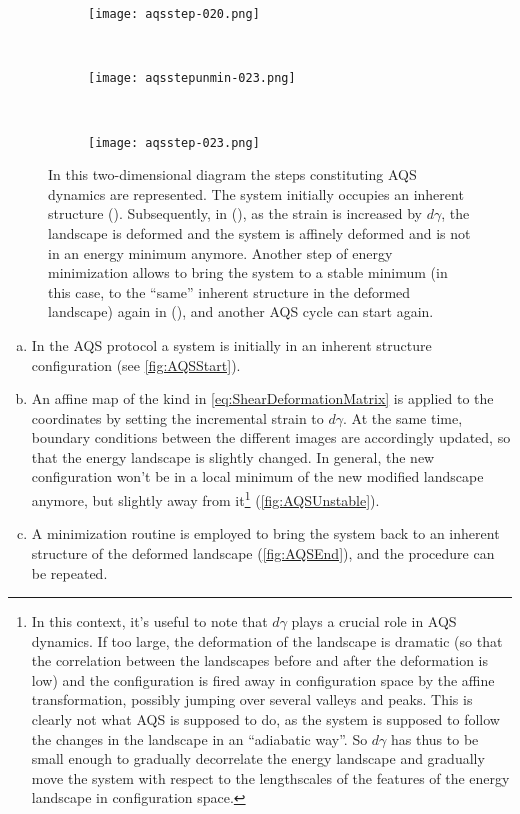 \begin{figure}
	\centering
	\begin{subfigure}[b]{\textwidth}
		\centering
		\texttt{[image: aqsstep-020.png]}
		\caption{\label{fig:AQSStart}}
	\end{subfigure} \\
	\begin{subfigure}[b]{\textwidth}
		\centering
		\texttt{[image: aqsstepunmin-023.png]}
		\caption{\label{fig:AQSUnstable}}
	\end{subfigure} \\
	\begin{subfigure}[b]{\textwidth}
		\centering
		\texttt{[image: aqsstep-023.png]}
		\caption{\label{fig:AQSEnd}}
	\end{subfigure} 
	\caption{In this two-dimensional diagram the steps constituting AQS dynamics are represented. The system initially occupies an inherent structure (). Subsequently, in (), as the strain is increased by $d\gamma$, the landscape is deformed and the system is affinely deformed and is not in an energy minimum anymore. Another step of energy minimization allows to bring the system to a stable minimum (in this case, to the ``same'' inherent structure in the deformed landscape) again in (), and another AQS cycle can start again.
	\label{fig:AQSsteps}}
\end{figure}

\begin{enumerate}[(a)]
\item In the AQS protocol a system is initially in an inherent structure configuration (see \autoref{fig:AQSStart}). 
\item An affine map of the kind in \autoref{eq:ShearDeformationMatrix} is applied to the coordinates by setting the incremental strain to $d\gamma$. 
At the same time, boundary conditions between the different images are accordingly updated, so that the energy landscape is slightly changed. In general, the new configuration won't be in a local minimum of the new modified landscape anymore, but slightly away from it\footnote{In this context, it's useful to note that $d\gamma$ plays a crucial role in AQS dynamics. If too large, the deformation of the landscape is dramatic (so that the correlation between the landscapes before and after the deformation is low) and the configuration is fired away in configuration space by the affine transformation, possibly jumping over several valleys and peaks. This is clearly not what AQS is supposed to do, as the system is supposed to follow the changes in the landscape in an ``adiabatic way''. So $d\gamma$ has thus to be small enough to gradually decorrelate the energy landscape and gradually move the system with respect to the lengthscales of the features of the energy landscape in configuration space.} (\autoref{fig:AQSUnstable}).
\item A minimization routine is employed to bring the system back to an inherent structure of the deformed landscape (\autoref{fig:AQSEnd}), and the procedure can be repeated.
\end{enumerate}

